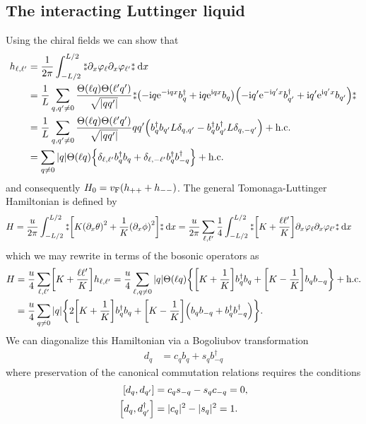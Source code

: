 \documentclass[english, parskip=full]{scrartcl}
\begin{document}
\subsection{The interacting Luttinger liquid}
Using the chiral fields we can show that
\begin{align}
h_{\ell,\ell'} &= \frac{1 }{2\pi}\intx{-L/2}{L/2}{\varnormord{\partial_x\varphi_\ell\partial_x\varphi_{\ell'}}}{x} \\
&= \frac{1 }{L} \sum_{q,q'\neq 0} \frac{\Theta(\ell q)\Theta(\ell'q')}{\sqrt{|qq'|}} \varnormord{\kla*{-\i q\powe{-\i qx} b_q^\dagger + \i q \powe{\i qx}b_q} \kla*{-\i q'\powe{-\i q'x} b_{q'}^\dagger + \i q' \powe{\i q'x}b_{q'}}}\\
&= \frac{1 }{L} \sum_{q,q'\neq 0} \frac{\Theta(\ell q)\Theta(\ell'q')}{\sqrt{|qq'|}} qq' \kla*{b_q^\dagger b_{q'} L\delta_{q,q'} - b_q^\dagger b_{q'}^\dagger L\delta_{q,-q'}} + \hc\\
&= \sum_{q\neq 0} |q|\Theta(\ell q) \klc*{\delta_{\ell,\ell'} b_q^\dagger b_q + \delta_{\ell,-\ell'} b_q^\dagger b_{-q}^\dagger } + \hc
\end{align}
and consequently $H_0 = \vf(h_{++} + h_{--})$.
The general Tomonaga-Luttinger Hamiltonian is defined by
\begin{align}
H &= \frac{u}{2\pi} \intx{-L/2}{L/2}{\varnormord{\klb*{K\kla*{\partial_x\theta}^2 + \frac{1}{K} \kla*{\partial_x\phi}^2}}}{x} = \frac{u}{2\pi} \sum_{\ell,\ell'} \frac{1}{4} \intx{-L/2}{L/2}{\varnormord{\klb*{K + \frac{\ell\ell'}{K}} \partial_x\varphi_\ell \partial_x\varphi_{\ell'}}}{x}
\end{align}
which we may rewrite in terms of the bosonic operators as
\begin{align}
H &= \frac{u}{4} \sum_{\ell,\ell'} \klb*{K + \frac{\ell\ell'}{K}} h_{\ell,\ell'} = \frac{u}{4} \sum_{\ell,q\neq 0} |q|\Theta(\ell q) \klc*{\klb*{K + \frac{1}{K}} b_q^\dagger b_q + \klb*{K - \frac{1}{K}} b_q b_{-q}} + \hc\\
&= \frac{u}{4} \sum_{q\neq 0} |q| \klc*{2\klb*{K + \frac{1}{K}} b_q^\dagger b_q + \klb*{K - \frac{1}{K}} \kla*{b_q b_{-q} + b_q^\dagger b_{-q}^\dagger}}.
\end{align}
We can diagonalize this Hamiltonian via a Bogoliubov transformation
\begin{align}
d_q &= c_q b_q + s_q b_{-q}^\dagger
\end{align}
where preservation of the canonical commutation relations requires the conditions
\begin{align}
\klb*{d_q, d_{q'}} &= c_q s_{-q} - s_q c_{-q} = 0,\\
\klb*{d_q, d_{q'}^\dagger} &= |c_q|^2 - |s_q|^2 = 1.
\end{align}
\end{document}
